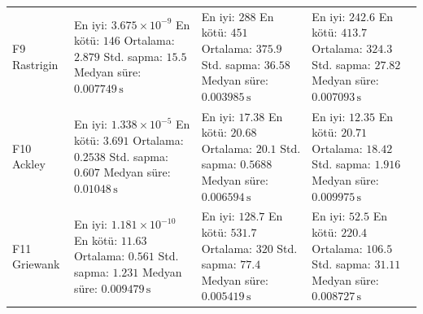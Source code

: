 \begin{longtable}{@{}p{2.25cm}p{4.25cm}p{4.25cm}p{4.25cm}@{}}
F9 Rastrigin & \makecell[l]{En iyi: $3.675\times 10^{-9}$\\ En kötü: $146$\\ Ortalama: $2.879$\\ Std. sapma: $15.5$\\ Medyan süre: $0.007749\,\mathrm{s}$} & \makecell[l]{En iyi: $288$\\ En kötü: $451$\\ Ortalama: $375.9$\\ Std. sapma: $36.58$\\ Medyan süre: $0.003985\,\mathrm{s}$} & \makecell[l]{En iyi: $242.6$\\ En kötü: $413.7$\\ Ortalama: $324.3$\\ Std. sapma: $27.82$\\ Medyan süre: $0.007093\,\mathrm{s}$} \\
F10 Ackley & \makecell[l]{En iyi: $1.338\times 10^{-5}$\\ En kötü: $3.691$\\ Ortalama: $0.2538$\\ Std. sapma: $0.607$\\ Medyan süre: $0.01048\,\mathrm{s}$} & \makecell[l]{En iyi: $17.38$\\ En kötü: $20.68$\\ Ortalama: $20.1$\\ Std. sapma: $0.5688$\\ Medyan süre: $0.006594\,\mathrm{s}$} & \makecell[l]{En iyi: $12.35$\\ En kötü: $20.71$\\ Ortalama: $18.42$\\ Std. sapma: $1.916$\\ Medyan süre: $0.009975\,\mathrm{s}$} \\
F11 Griewank & \makecell[l]{En iyi: $1.181\times 10^{-10}$\\ En kötü: $11.63$\\ Ortalama: $0.561$\\ Std. sapma: $1.231$\\ Medyan süre: $0.009479\,\mathrm{s}$} & \makecell[l]{En iyi: $128.7$\\ En kötü: $531.7$\\ Ortalama: $320$\\ Std. sapma: $77.4$\\ Medyan süre: $0.005419\,\mathrm{s}$} & \makecell[l]{En iyi: $52.5$\\ En kötü: $220.4$\\ Ortalama: $106.5$\\ Std. sapma: $31.11$\\ Medyan süre: $0.008727\,\mathrm{s}$} \\

\end{longtable}
